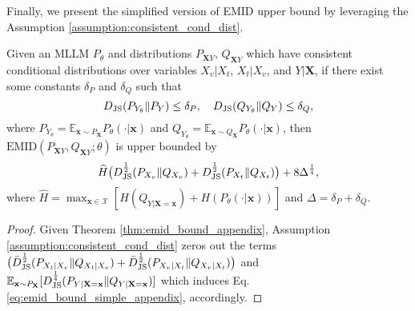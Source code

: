 Finally, we present the simplified version of EMID upper bound by leveraging the Assumption \ref{assumption:consistent_cond_dist}.
\begin{theorem}\label{thm:emid_bound_simple_appendix} 
 Given an MLLM $P_{\theta}$ and distributions $P_{\mathbf{X}Y}$, $Q_{\mathbf{X}Y}$ which have consistent conditional distributions over variables $X_{v}|X_{t}$, $X_{t}|X_{v}$, and $Y|\mathbf{X}$,
if there exist some constants $\delta_{P}$ and $\delta_{Q}$ such that
\begin{equation*}
    D_{\rm JS}(P_{Y_{{\theta}}}\|P_{Y})\leq \delta_{P},~~~ D_{\rm JS}(Q_{Y_{{\theta}}}\|Q_{Y})\leq \delta_{Q},
\end{equation*}
where $P_{Y_{\theta}}=\mathbb{E}_{\mathbf{x}\sim P_{\mathbf{X}}} P_{{\theta}}(\cdot|\mathbf{x})$ and $Q_{Y_{\theta}}=\mathbb{E}_{\mathbf{x}\sim Q_{\mathbf{X}}} P_{{\theta}}(\cdot|\mathbf{x})$, then $\text{EMID}(P_{\mathbf{X}Y},Q_{\mathbf{X}Y};\theta)$ is upper bounded by
\begin{equation}\label{eq:emid_bound_simple_appendix}
    \begin{split}
     \widehat{H}\big( { D^{\frac{1}{2}}_{\rm JS}(P_{X_{v}}\|Q_{X_{v}})} + {D^{\frac{1}{2}}_{\rm JS}(P_{X_{t}}\|Q_{X_{t}})} \big) + 8\Delta^{\frac{1}{4}},
    \end{split}
\end{equation}
\normalsize
where $ \widehat{H}=\max_{\mathbf{x}\in\mathcal{X}} [H(Q_{Y|\mathbf{X}=\mathbf{x}})+H(P_{\theta}(\cdot|\mathbf{x}))]$ and $\Delta=\delta_{P}+\delta_{Q}$. 
\end{theorem}
\begin{proof}
Given Theorem \ref{thm:emid_bound_appendix}, Assumption \ref{assumption:consistent_cond_dist} zeros out the terms $\big({\bar{D}^{\frac{1}{2}}_{\rm JS}(P_{X_{t}|X_{v}}\|Q_{X_{t}|X_{v}})+\bar{D}^{\frac{1}{2}}_{\rm JS}(P_{X_{v}|X_{t}}\|Q_{X_{v}|X_{t}})} \big)$ and $\mathbb{E}_{\mathbf{x}\sim P_{\mathbf{X}} } [D^{\frac{1}{4}}_{\rm JS}(P_{Y|\mathbf{X}=\mathbf{x}}\|Q_{Y|\mathbf{X}=\mathbf{x}})]$ which induces Eq. \eqref{eq:emid_bound_simple_appendix}, accordingly.
\end{proof}



























